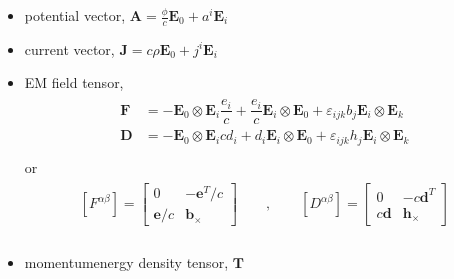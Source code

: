 \documentclass[letterpaper,10pt,english]{jupyterBook}
\begin{document}
\begin{itemize}
\item {} 
\sphinxhyphen{}potential vector, \(\mathbf{A} = \frac{\phi}{c} \mathbf{E}_0 + a^i \mathbf{E}_i\)

\item {} 
\sphinxhyphen{}current vector, \(\mathbf{J} = c \rho \mathbf{E}_0 + j^i \mathbf{E}_i\)

\item {} 
\sphinxAtStartPar
EM field tensor,
\begin{equation*}
\begin{split}\begin{aligned}
      \mathbf{F} & = - \mathbf{E}_0 \otimes \mathbf{E}_i \dfrac{e_i}{c} + \dfrac{e_i}{c} \mathbf{E}_i \otimes \mathbf{E}_0 + \varepsilon_{ijk} b_j \mathbf{E}_i \otimes \mathbf{E}_k \\
      \mathbf{D} & = - \mathbf{E}_0 \otimes \mathbf{E}_i c d_i + d_i \mathbf{E}_i \otimes \mathbf{E}_0 + \varepsilon_{ijk} h_j \mathbf{E}_i \otimes \mathbf{E}_k \\
    \end{aligned}\end{split}
\end{equation*}
\sphinxAtStartPar
or
\begin{equation*}
\begin{split}\begin{aligned}
      \left[F^{\alpha \beta}\right] = \begin{bmatrix} 0 & - \mathbf{e}^T / c \\ \mathbf{e}/c & \mathbf{b}_{\times}  \end{bmatrix}  \qquad , \qquad
      \left[D^{\alpha \beta}\right] = \begin{bmatrix} 0 & - c \mathbf{d}^T   \\ c \mathbf{d} & \mathbf{h}_{\times}  \end{bmatrix}  \\
    \end{aligned}\end{split}
\end{equation*}
\item {} 
\sphinxhyphen{}momentum\sphinxhyphen{}energy density tensor, \(\mathbf{T}\)

\end{itemize}
\end{document}
